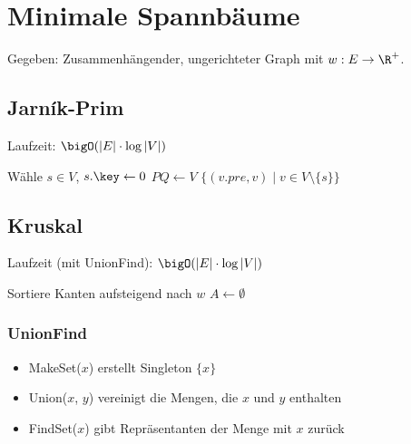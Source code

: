 \section*{Minimale Spannbäume}
Gegeben: Zusammenhängender, ungerichteter Graph mit $w: E \to \R^+$.

\subsection*{Jarn\'ik-Prim}
Laufzeit: $\bigO(|E| \cdot \log|V|)$

\begin{algorithm}[H]
	Wähle $s\in V$, $s.\key \gets 0$\;
	$PQ \gets V$\;
	\KwRet $\{(v.pre, v) \mid v \in V\setminus\{s\}\}$
\end{algorithm}

\subsection*{Kruskal}
Laufzeit (mit UnionFind): $\bigO(|E|\cdot\log|V|)$

\begin{algorithm}[H]
	Sortiere Kanten aufsteigend nach $w$\;
	$A \gets \emptyset$\;
\end{algorithm}

\subsubsection*{UnionFind}
\begin{itemize}
	\item MakeSet($x$) erstellt Singleton $\{x\}$
	\item Union($x$, $y$) vereinigt die Mengen, die $x$ und $y$ enthalten
	\item FindSet($x$) gibt Repräsentanten der Menge mit $x$ zurück
\end{itemize}
